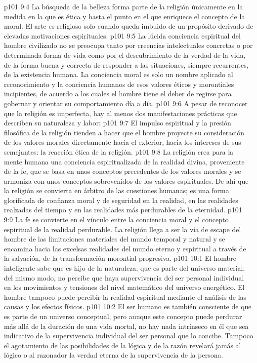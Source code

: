 \vs p101 9:4 La búsqueda de la belleza forma parte de la religión únicamente en la medida en la que es ética y hasta el punto en el que enriquece el concepto de la moral. El arte es religioso solo cuando queda imbuido de un propósito derivado de elevadas motivaciones espirituales.
\vs p101 9:5 La lúcida conciencia espiritual del hombre civilizado no se preocupa tanto por creencias intelectuales concretas o por determinada forma de vida como por el descubrimiento de la verdad de la vida, de la forma buena y correcta de responder a las situaciones, siempre recurrentes, de la existencia humana. La conciencia moral es solo un nombre aplicado al reconocimiento y la conciencia humanos de esos valores éticos y morontiales incipientes, de acuerdo a los cuales el hombre tiene el deber de regirse para gobernar y orientar su comportamiento día a día.
\vs p101 9:6 \pc A pesar de reconocer que la religión es imperfecta, hay al menos dos manifestaciones prácticas que describen su naturaleza y labor:
\vs p101 9:7 El impulso espiritual y la presión filosófica de la religión tienden a hacer que el hombre proyecte su consideración de los valores morales directamente hacia el exterior, hacia los intereses de sus semejantes: la reacción ética de la religión.
\vs p101 9:8 La religión crea para la mente humana una conciencia espiritualizada de la realidad divina, proveniente de la fe, que se basa en unos conceptos precedentes de los valores morales y se armoniza con unos conceptos sobrevenidos de los valores espirituales. De ahí que la religión se convierta en árbitro de las cuestiones humanas; es una forma glorificada de confianza moral y de seguridad en la realidad, en las realidades realzadas del tiempo y en las realidades más perdurables de la eternidad.
\vs p101 9:9 \pc La fe se convierte en el vínculo entre la conciencia moral y el concepto espiritual de la realidad perdurable. La religión llega a ser la vía de escape del hombre de las limitaciones materiales del mundo temporal y natural y se encamina hacia las excelsas realidades del mundo eterno y espiritual a través de la salvación, de la transformación morontial progresiva.
\vs p101 10:1 El hombre inteligente sabe que es hijo de la naturaleza, que es parte del universo material; del mismo modo, no percibe que haya supervivencia del ser personal individual en los movimientos y tensiones del nivel matemático del universo energético. El hombre tampoco puede percibir la realidad espiritual mediante el análisis de las causas y los efectos físicos.
\vs p101 10:2 El ser humano es también consciente de que es parte de un universo conceptual, pero aunque este concepto puede perdurar más allá de la duración de una vida mortal, no hay nada intrínseco en él que sea indicativo de la supervivencia individual del ser personal que lo concibe. Tampoco el agotamiento de las posibilidades de la lógica y de la razón revelará jamás al lógico o al razonador la verdad eterna de la supervivencia de la persona.

